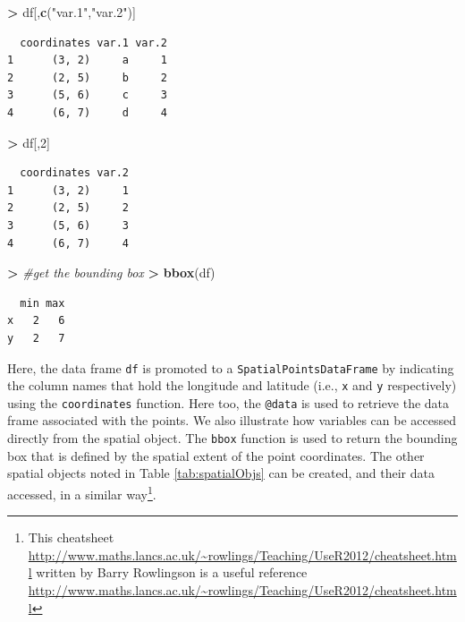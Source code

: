 \documentclass[]{krantz}
\makeatletter
\newenvironment{Shaded}{\begin{snugshade}}{\end{snugshade}}
\newcommand{\KeywordTok}[1]{\textcolor[rgb]{0.27,0.27,0.27}{\textbf{#1}}}
\newcommand{\DecValTok}[1]{\textcolor[rgb]{0.06,0.06,0.06}{#1}}
\newcommand{\StringTok}[1]{\textcolor[rgb]{0.5,0.5,0.5}{#1}}
\newcommand{\CommentTok}[1]{\textcolor[rgb]{0.37,0.37,0.37}{\textit{#1}}}
\newcommand{\OperatorTok}[1]{\textcolor[rgb]{0.43,0.43,0.43}{\textbf{#1}}}
\newcommand{\ErrorTok}[1]{\textcolor[rgb]{0.14,0.14,0.14}{\textbf{#1}}}
\newcommand{\NormalTok}[1]{#1}
\newenvironment{kframe}{%
\medskip{}
\setlength{\fboxsep}{.8em}
 \def\at@end@of@kframe{}%
 \ifinner\ifhmode%
  \def\at@end@of@kframe{\end{minipage}}%
  \begin{minipage}{\columnwidth}%
 \fi\fi%
 \def\FrameCommand##1{\hskip\@totalleftmargin \hskip-\fboxsep
 \colorbox{shadecolor}{##1}\hskip-\fboxsep
     \hskip-\linewidth \hskip-\@totalleftmargin \hskip\columnwidth}%
 \MakeFramed {\advance\hsize-\width
   \@totalleftmargin\z@ \linewidth\hsize
   \@setminipage}}%
 {\par\unskip\endMakeFramed%
 \at@end@of@kframe}
\renewenvironment{Shaded}{\begin{kframe}}{\end{kframe}}
\makeatother
\begin{document}
\begin{Shaded}
\begin{Highlighting}[]
\OperatorTok{>}\StringTok{ }\NormalTok{df[,}\KeywordTok{c}\NormalTok{(}\StringTok{"var.1"}\NormalTok{,}\StringTok{"var.2"}\NormalTok{)]}
\end{Highlighting}
\end{Shaded}

\begin{verbatim}
  coordinates var.1 var.2
1      (3, 2)     a     1
2      (2, 5)     b     2
3      (5, 6)     c     3
4      (6, 7)     d     4
\end{verbatim}

\begin{Shaded}
\begin{Highlighting}[]
\OperatorTok{>}\StringTok{ }\NormalTok{df[,}\DecValTok{2}\NormalTok{]}
\end{Highlighting}
\end{Shaded}

\begin{verbatim}
  coordinates var.2
1      (3, 2)     1
2      (2, 5)     2
3      (5, 6)     3
4      (6, 7)     4
\end{verbatim}

\begin{Shaded}
\begin{Highlighting}[]
\OperatorTok{>}\StringTok{ }\CommentTok{#get the bounding box}
\ErrorTok{>}\StringTok{ }\KeywordTok{bbox}\NormalTok{(df)}
\end{Highlighting}
\end{Shaded}

\begin{verbatim}
  min max
x   2   6
y   2   7
\end{verbatim}

Here, the data frame \texttt{df} is promoted to a
\texttt{SpatialPointsDataFrame} by indicating the column names that hold
the longitude and latitude (i.e., \texttt{x} and \texttt{y}
respectively) using the \texttt{coordinates} function. Here too, the
\texttt{@data} is used to retrieve the data frame associated with the
points. We also illustrate how variables can be accessed directly from
the spatial object. The \texttt{bbox} function is used to return the
bounding box that is defined by the spatial extent of the point
coordinates. The other spatial objects noted in Table
\ref{tab:spatialObjs} can be created, and their data accessed, in a
similar way\footnote{This cheatsheet
  \url{http://www.maths.lancs.ac.uk/~rowlings/Teaching/UseR2012/cheatsheet.html}
  written by Barry Rowlingson is a useful reference
  \url{http://www.maths.lancs.ac.uk/~rowlings/Teaching/UseR2012/cheatsheet.html}}.
\end{document}
